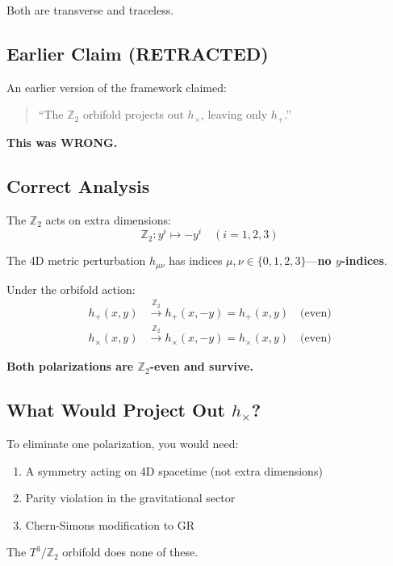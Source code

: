 \documentclass[12pt,a4paper]{article}
\begin{document}
Both are transverse and traceless.

\subsection{Earlier Claim (RETRACTED)}

An earlier version of the framework claimed:
\begin{quote}
``The $\mathbb{Z}_2$ orbifold projects out $h_\times$, leaving only $h_+$.''
\end{quote}

\textbf{This was WRONG.}

\subsection{Correct Analysis}

The $\mathbb{Z}_2$ acts on extra dimensions:
\begin{equation}
\mathbb{Z}_2: y^i \mapsto -y^i \quad (i = 1, 2, 3)
\end{equation}

The 4D metric perturbation $h_{\mu\nu}$ has indices $\mu, \nu \in \{0, 1, 2, 3\}$---\textbf{no $y$-indices}.

Under the orbifold action:
\begin{align}
h_+(x, y) &\xrightarrow{\mathbb{Z}_2} h_+(x, -y) = h_+(x, y) \quad \text{(even)} \\
h_\times(x, y) &\xrightarrow{\mathbb{Z}_2} h_\times(x, -y) = h_\times(x, y) \quad \text{(even)}
\end{align}

\textbf{Both polarizations are $\mathbb{Z}_2$-even and survive.}

\subsection{What Would Project Out $h_\times$?}

To eliminate one polarization, you would need:
\begin{enumerate}
    \item A symmetry acting on 4D spacetime (not extra dimensions)
    \item Parity violation in the gravitational sector
    \item Chern-Simons modification to GR
\end{enumerate}

The $T^3/\mathbb{Z}_2$ orbifold does none of these.
\end{document}
